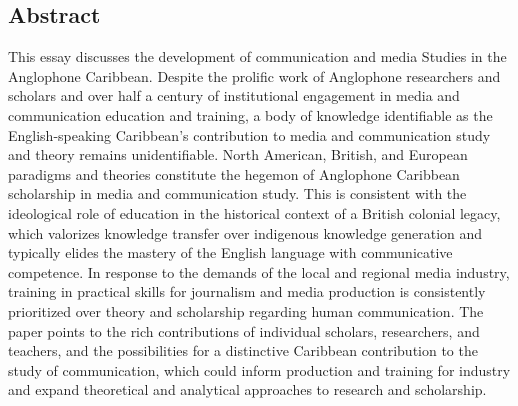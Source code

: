 \documentclass{tufte-handout}
\begin{document}
\begin{titlepage}
\vspace*{1em}

\hypertarget{abstract}{%
\section{Abstract}\label{abstract}}

This essay discusses the development of communication and media Studies in the Anglophone Caribbean. Despite the prolific work of Anglophone researchers and scholars and over half a century of institutional engagement in media and communication education and training, a body of knowledge identifiable as the English-speaking Caribbean’s contribution to media and communication study and theory remains unidentifiable. North American, British, and European paradigms and theories constitute the hegemon of Anglophone Caribbean scholarship in media and communication study. This is consistent with the ideological role of education in the historical context of a British colonial legacy, which valorizes knowledge transfer over indigenous knowledge generation and typically elides the mastery of the English language with communicative competence. In response to the demands of the local and regional media industry, training in practical skills for journalism and media production is consistently prioritized over theory and scholarship regarding human communication. The paper points to the rich contributions of individual scholars, researchers, and teachers, and the possibilities for a distinctive Caribbean contribution to the study of communication, which could inform production and training for industry and expand theoretical and analytical approaches to research and scholarship.


\enlargethispage{2\baselineskip}

\vspace*{2em}



 \end{titlepage}

\end{document}
